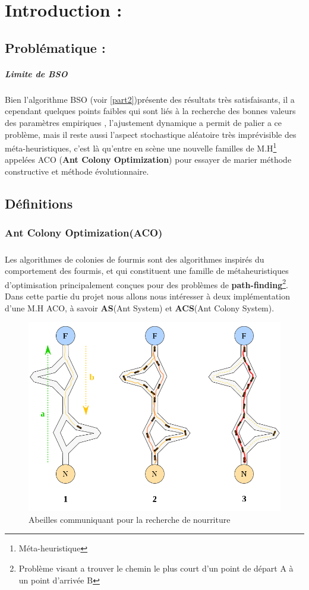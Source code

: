 
\chapter{Introduction : }
\section{Problématique : }
\paragraph{Limite de BSO }
Bien l'algorithme BSO (voir \ref{part2})présente des résultats très satisfaisants, il a cependant quelques points faibles qui sont liés à la recherche des bonnes valeurs des paramètres empiriques , l'ajustement dynamique a permit de palier a ce problème, mais il reste aussi l'aspect stochastique aléatoire très imprévisible des méta-heuristiques, c'est là qu'entre en scène une nouvelle familles de  M.H\footnote{Méta-heuristique} appelées ACO (\textbf{Ant Colony Optimization}) pour essayer de marier méthode constructive et méthode évolutionnaire.
\section{Définitions}
\subsection{Ant Colony Optimization(ACO)}
\paragraph{}
Les algorithmes de colonies de fourmis sont des algorithmes inspirés du comportement des fourmis, et qui constituent une famille de métaheuristiques d’optimisation principalement conçues pour des problèmes de \textbf{path-finding}\footnote{Problème visant a trouver le chemin le plus court d'un point de départ A à un point d'arrivée B}.
Dans cette partie du projet nous allons nous intéresser à deux implémentation d'une M.H ACO, à savoir \textbf{AS}(Ant System) et \textbf{ACS}(Ant Colony System).
\begin{figure}[H]
	\centering
	\includegraphics[scale=0.25]{images/ants.png}
	\caption{Abeilles communiquant pour la recherche de nourriture}
\end{figure}

